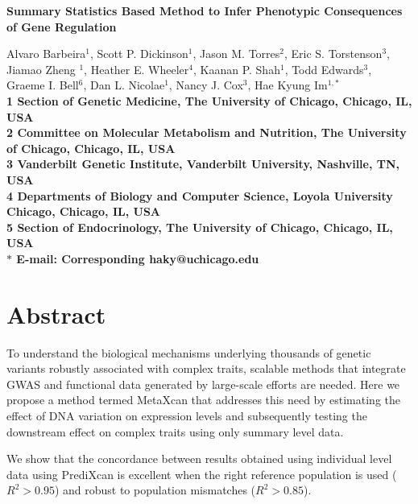 \documentclass[10pt]{article}
\date{}
\begin{document}
\begin{flushleft}
{\Large
\textbf{Summary Statistics Based Method to Infer Phenotypic Consequences of Gene Regulation}
}

Alvaro Barbeira$^{1}$,
Scott P. Dickinson$^{1}$,
Jason M. Torres$^{2}$,
Eric S. Torstenson$^{3}$,
Jiamao Zheng $^{1}$,
Heather E. Wheeler$^4$,
Kaanan P. Shah$^{1}$, 
Todd Edwards$^{3}$,
Graeme I. Bell$^{6}$,
Dan L. Nicolae$^{1}$,
Nancy J. Cox$^{3}$,
Hae Kyung Im$^{1,\ast}$
\\
\bf{1} Section of Genetic Medicine, The University of Chicago, Chicago, IL, USA
\\
\bf{2} Committee on Molecular Metabolism and Nutrition, The University of Chicago, Chicago, IL, USA
\\
\bf{3} Vanderbilt Genetic Institute, Vanderbilt University, Nashville, TN, USA
\\
\bf{4} Departments of Biology and Computer Science, Loyola University Chicago, Chicago, IL, USA
\\
\bf{5} Section of Endocrinology, The University of Chicago, Chicago, IL, USA
\\
$\ast$ E-mail: Corresponding haky@uchicago.edu
\end{flushleft}

\section*{Abstract}

To understand the biological mechanisms underlying thousands of genetic variants robustly associated with complex traits, scalable methods that integrate GWAS and functional data generated by large-scale efforts are needed. Here we propose a method termed MetaXcan that addresses this need by estimating the effect of DNA variation on expression levels and subsequently testing the downstream effect on complex traits using only summary level data.

We show that the concordance between results obtained using individual level data using PrediXcan is excellent when the right reference population is used ($R^2 > 0.95$) and robust to population mismatches ($R^2 > 0.85$).
\end{document}
